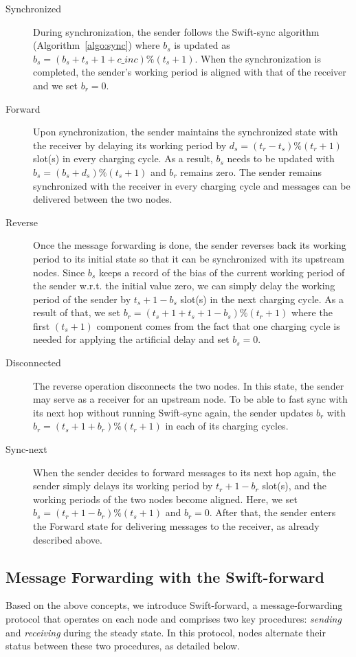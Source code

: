 \documentclass[lettersize,journal]{IEEEtran}
\newcommand{\ours}{Swift\xspace}
\newcommand{\forward}{Swift-forward\xspace}
\begin{document}
\begin{description}
    \item[Synchronized] During synchronization, the sender follows the \ours-sync algorithm (Algorithm~\ref{algo:sync}) where $b_s$ is updated as 
    $b_s = (b_s + t_s + 1 + c\_inc)\%(t_s + 1)$. When the synchronization is completed, the sender's working period is aligned with that of the receiver and we set $b_r = 0$. 
    \item[Forward] Upon synchronization, the sender maintains the synchronized state with the receiver by delaying its working period by $d_s = (t_r - t_s) \% (t_r + 1)$ slot(s) in every charging cycle. As a result, $b_s$ needs to be updated with $b_s = (b_s + d_s) \% (t_s + 1)$ and $b_r$ remains zero. The sender remains synchronized with the receiver in every charging cycle and messages can be delivered between the two nodes.
    \item[Reverse] Once the message forwarding is done, the sender reverses back its working period to its initial state so that it can be synchronized with its upstream nodes. Since $b_s$ keeps a record of the bias of the current working period of the sender w.r.t. the initial value zero, we can simply delay the working period of the sender by $t_s + 1 - b_s$ slot(s) in the next charging cycle. As a result of that, we set $b_r = (t_s + 1 + t_s + 1 - b_s)\%(t_r + 1)$ where the first $(t_s + 1)$ component comes from the fact that one charging cycle is needed for applying the artificial delay and set $b_s = 0$.
    \item[Disconnected] The reverse operation disconnects the two nodes. In this state, the sender may serve as a receiver for an upstream node. To be able to fast sync with its next hop without running \ours-sync again, the sender updates $b_r$ with 
    $b_r = (t_s + 1 + b_r)\%(t_r + 1)$ in each of its charging cycles. 
    \item[Sync-next] When the sender decides to forward messages to its next hop again, the sender simply delays its working period by $t_r + 1 - b_r$ slot(s), and the working periods of the two nodes become aligned. Here, we set $b_s = (t_r + 1 - b_r)\%(t_s + 1)$ and $b_r = 0$. After that, the sender enters the Forward state for delivering messages to the receiver, as already described above.
\end{description}


\subsection{Message Forwarding with the \forward}
\label{sec:forwarding:protocol}
Based on the above concepts, we introduce \forward, a message-forwarding protocol that operates on each node and comprises two key procedures: \emph{sending} and \emph{receiving} during the steady state. In this protocol, nodes alternate their status between these two procedures, as detailed below.
\end{document}
